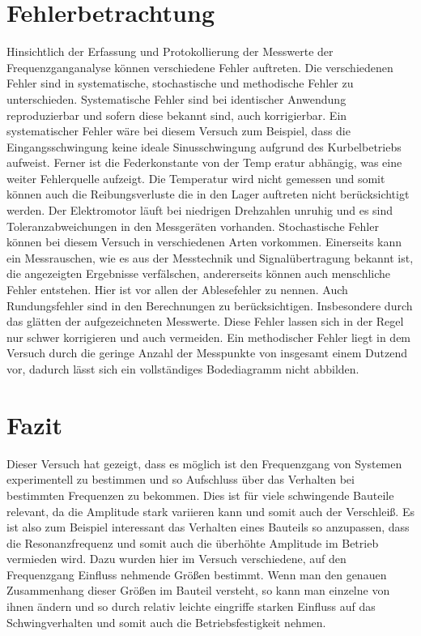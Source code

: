 \documentclass[a4paper,12pt]{scrartcl}
\begin{document}
\section{Fehlerbetrachtung}
Hinsichtlich der Erfassung und Protokollierung der Messwerte der
Frequenzganganalyse können verschiedene Fehler auftreten. Die verschiedenen Fehler
sind in systematische, stochastische und methodische Fehler zu unterschieden.
Systematische Fehler sind bei identischer Anwendung reproduzierbar und sofern diese
bekannt sind, auch korrigierbar. Ein systematischer Fehler wäre bei diesem Versuch
zum Beispiel, dass die Eingangsschwingung keine ideale Sinusschwingung aufgrund
des Kurbelbetriebs aufweist. Ferner ist die Federkonstante von der Temp eratur
abhängig, was eine weiter Fehlerquelle aufzeigt. Die Temperatur wird nicht gemessen
und somit können auch die Reibungsverluste die in den Lager auftreten nicht
berücksichtigt werden. Der Elektromotor läuft bei niedrigen Drehzahlen unruhig und
es sind Toleranzabweichungen in den Messgeräten vorhanden. Stochastische Fehler
können bei diesem Versuch in verschiedenen Arten vorkommen. Einerseits kann ein
Messrauschen, wie es aus der Messtechnik und Signalübertragung bekannt ist, die
angezeigten Ergebnisse verfälschen, andererseits können auch menschliche Fehler
entstehen. Hier ist vor allen der Ablesefehler zu nennen. Auch Rundungsfehler sind
in den Berechnungen zu berücksichtigen. Insbesondere durch das glätten der
aufgezeichneten Messwerte. Diese Fehler lassen sich in der Regel nur schwer
korrigieren und auch vermeiden. Ein methodischer Fehler liegt in dem Versuch durch
die geringe Anzahl der Messpunkte von insgesamt einem Dutzend vor, dadurch lässt sich
ein vollständiges Bodediagramm nicht abbilden.

\section{Fazit}
Dieser Versuch hat gezeigt, dass es möglich ist den Frequenzgang von Systemen experimentell zu bestimmen und so Aufschluss über das Verhalten
bei bestimmten Frequenzen zu bekommen. Dies ist für viele schwingende Bauteile relevant, da die Amplitude stark variieren kann und somit auch
der Verschleiß. Es ist also zum Beispiel interessant das Verhalten eines Bauteils so anzupassen, dass die Resonanzfrequenz und somit auch die
überhöhte Amplitude im Betrieb vermieden wird. Dazu wurden hier im Versuch verschiedene, auf den Frequenzgang Einfluss nehmende Größen bestimmt.
Wenn man den genauen Zusammenhang dieser Größen im Bauteil versteht, so kann man einzelne von ihnen ändern und so durch relativ leichte eingriffe
starken Einfluss auf das Schwingverhalten und somit auch die Betriebsfestigkeit nehmen.


\pagebreak
\nocite{*}
\sloppy %
\printbibliography
\end{document}
